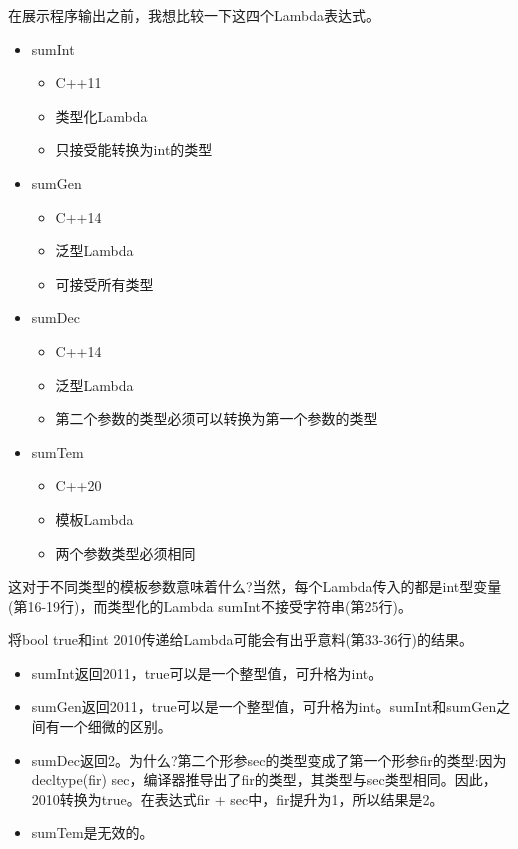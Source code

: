 在展示程序输出之前，我想比较一下这四个Lambda表达式。

\begin{itemize}
\item 
sumInt
\begin{itemize}
\item 
C++11

\item 
类型化Lambda

\item 
只接受能转换为int的类型
\end{itemize}

\item 
sumGen
\begin{itemize}
\item 
C++14

\item 
泛型Lambda

\item 
可接受所有类型
\end{itemize}

\item 
sumDec
\begin{itemize}
\item 
C++14

\item 
泛型Lambda

\item 
第二个参数的类型必须可以转换为第一个参数的类型
\end{itemize}

\item 
sumTem
\begin{itemize}
\item 
C++20

\item 
模板Lambda

\item 
两个参数类型必须相同
\end{itemize}
\end{itemize}

这对于不同类型的模板参数意味着什么?当然，每个Lambda传入的都是int型变量(第16-19行)，而类型化的Lambda sumInt不接受字符串(第25行)。

将bool true和int 2010传递给Lambda可能会有出乎意料(第33-36行)的结果。

\begin{itemize}
\item 
sumInt返回2011，true可以是一个整型值，可升格为int。

\item 
sumGen返回2011，true可以是一个整型值，可升格为int。sumInt和sumGen之间有一个细微的区别。

\item 
sumDec返回2。为什么?第二个形参sec的类型变成了第一个形参fir的类型:因为decltype(fir) sec，编译器推导出了fir的类型，其类型与sec类型相同。因此，2010转换为true。在表达式fir + sec中，fir提升为1，所以结果是2。

\item 
sumTem是无效的。
\end{itemize}

